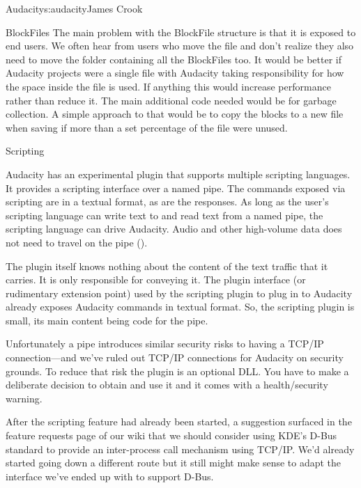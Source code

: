 \begin{aosachapter}{Audacity}{s:audacity}{James Crook}
\begin{aosasect1}{BlockFiles}
The main problem with the BlockFile structure is that it is exposed to
end users.  We often hear from users who move the  file and don't
realize they also need to move the folder containing all the
BlockFiles too.  It would be better if Audacity projects were a single
file with Audacity taking responsibility for how the space inside the
file is used.  If anything this would increase performance rather than
reduce it.  The main additional code needed would be for garbage
collection.  A simple approach to that would be to copy the blocks to
a new file when saving if more than a set percentage of the file were
unused.

\end{aosasect1}

\begin{aosasect1}{Scripting}

Audacity has an experimental plugin that supports multiple scripting
languages.  It provides a scripting interface over a named pipe.  The
commands exposed via scripting are in a textual format, as are the
responses.  As long as the user's scripting language can write text to
and read text from a named pipe, the scripting language can drive
Audacity.  Audio and other high-volume data does not need to travel on
the pipe ().


The plugin itself knows nothing about the content of the text traffic
that it carries. It is only responsible for conveying it. The plugin
interface (or rudimentary extension point) used by the scripting
plugin to plug in to Audacity already exposes Audacity commands in
textual format.  So, the scripting plugin is small, its main content
being code for the pipe.

Unfortunately a pipe introduces similar security risks to having a
TCP/IP connection---and we've ruled out TCP/IP connections for
Audacity on security grounds.  To reduce that risk the plugin is an
optional DLL\@.  You have to make a deliberate decision to obtain and
use it and it comes with a health/security warning.

After the scripting feature had already been started, a suggestion
surfaced in the feature requests page of our wiki that we should
consider using KDE's D-Bus standard to provide an inter-process call
mechanism using TCP/IP\@.  We'd already started going down a different
route but it still might make sense to adapt the interface we've ended
up with to support D-Bus.


\end{aosasect1}
\end{aosachapter}
